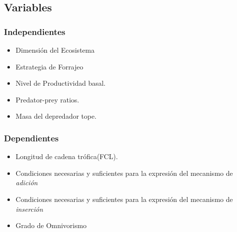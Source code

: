 \documentclass[a4paper,11pt]{article}
\begin{document}
\subsection{Variables}
\subsubsection{Independientes}
\begin{itemize}
\item Dimensi\'on del Ecosistema
\item Estrategia de Forrajeo
\item Nivel de Productividad basal.
\item Predator-prey ratios.
\item Masa del depredador tope.
\end{itemize}
\subsubsection{Dependientes}
\begin{itemize}
\item Longitud de cadena tr\'ofica(FCL).
\item Condiciones necesarias y suficientes para la expresi\'on del mecanismo de \textit{adici\'on}
\item Condiciones necesarias y suficientes para la expresi\'on del mecanismo de \textit{inserci\'on}
\item Grado de Omnivorismo

\end{itemize}
\end{document}
